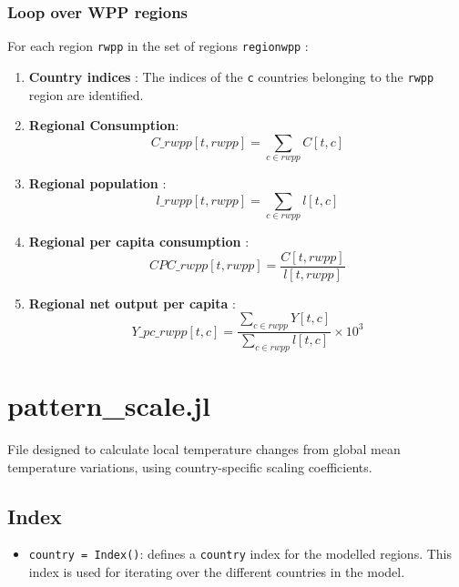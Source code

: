 \documentclass[
]{article}
\providecommand{\tightlist}{%
  \setlength{\itemsep}{0pt}\setlength{\parskip}{0pt}}
\begin{document}
\subsubsection{Loop over WPP regions}\label{loop-over-wpp-regions}

For each region \texttt{rwpp} in the set of regions \texttt{regionwpp} :

\begin{enumerate}
\def\labelenumi{\arabic{enumi}.}
\item
  \textbf{Country indices} : The indices of the \texttt{c} countries
  belonging to the \texttt{rwpp} region are identified.
\item
  \textbf{Regional Consumption}:
  \begin{equation}
 C\_rwpp[t, rwpp] = \sum_{c \in rwpp} C[t, c]
\end{equation}

\item
  \textbf{Regional population} :
  \begin{equation}
 l\_rwpp[t, rwpp] = \sum_{c \in rwpp} l[t, c]
\end{equation}

\item
  \textbf{Regional per capita consumption} :
  \begin{equation}
 CPC\_rwpp[t,rwpp] = \frac{C[t,rwpp]}{l[t,rwpp]}
\end{equation}

\item
  \textbf{Regional net output per capita} :
  \begin{equation}
 Y\_pc\_rwpp[t,c] = \frac{\sum_{c \in rwpp}Y[t,c]}{\sum_{c \in rwpp}l[t,c]} \times 10^3 
\end{equation}

\end{enumerate}


\section{pattern\_scale.jl}\label{pattern_scale.jl}

File designed to calculate local temperature changes from global mean
temperature variations, using country-specific scaling coefficients.

\subsection{Index}\label{index-1}

\begin{itemize}
\tightlist
\item
  \texttt{country\ =\ Index()}: defines a \texttt{country} index for the
  modelled regions. This index is used for iterating over the different
  countries in the model.
\end{itemize}
\end{document}
